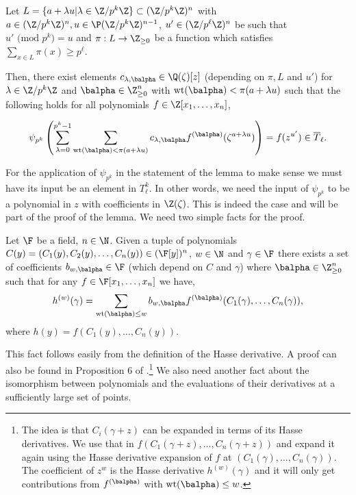 \begin{lem}\label{lem:deRich}
Let $L=\{a+\lambda u| \lambda \in \Z/p^k\Z\}\subset (\Z/p^k\Z)^n$ with $a\in (\Z/p^k\Z)^n,u\in \P (\Z/p^k\Z)^{n-1}$, $u'\in (\Z/p^\ell\Z)^n$ be such that {\em $u'\text{ (mod }p^k\text{)}=u$} and $\pi:L\rightarrow \Z_{\ge 0}$ be a function which satisfies $\sum_{x\in L} \pi(x) \ge p^\ell$. 


Then, there exist elements $c_{\lambda,\balpha} \in \Q(\zeta)[z]$ (depending on $\pi,L$ and $u'$) for $\lambda \in \Z/p^k\Z$ and $\balpha\in  \Z_{\ge 0}^n$ with $\text{wt}(\balpha)< \pi(a+\lambda u)$ such that the following holds for all polynomials $f\in \Z[x_1,\hdots,x_n]$,

{\em$$ \psi_{p^k}\left(\sum\limits_{\lambda =0}^{p^k-1}\sum\limits_{\text{wt}(\balpha) < \pi(a+\lambda u) }c_{\lambda,\balpha} f^{(\balpha)}(\zeta^{a+\lambda u})\right)= f(z^{u'})\in \overline{T}_\ell .$$}
\end{lem}
For the application of $\psi_{p^k}$ in the statement of the lemma to make sense we must have its input be an element in $T_\ell^k$. In other words, we need the input of $\psi_{p^k}$ to be a polynomial in $z$ with coefficients in $\Z(\zeta)$. This is indeed the case and will be part of the proof of the lemma. We need two simple facts for the proof.

\begin{lem}\label{fact:com}
Let $\F$ be a field, $n\in \N$. Given a tuple of polynomials $C(y)=(C_1(y),C_2(y),\hdots,C_n(y))\in (\F[y])^n$, $w\in \N$ and $\gamma\in \F$ there exists a set of coefficients $b_{w,\balpha}\in \F$ (which depend on $C$ and $\gamma$) where $\balpha \in \Z^n_{\ge 0}$ such that for any $f\in \F[x_1,\hdots,x_n]$ we have,
$$h^{(w)}(\gamma)=\sum\limits_{\text{wt}(\balpha)\le w} b_{w,\balpha} f^{(\balpha)}(C_1(\gamma),\hdots,C_n(\gamma)), $$
where $h(y)=f(C_1(y),\hdots,C_n(y))$. 

\end{lem}

This fact follows easily from the definition of the Hasse derivative. A proof can also be found in Proposition 6 of \cite{dvir2013extensions}.\footnote{The idea is that $C_i(\gamma+z)$ can be expanded in terms of its Hasse derivatives. We use that in $f(C_1(\gamma+z),\hdots,C_n(\gamma+z))$ and expand it again using the Hasse derivative expansion of $f$ at $(C_1(\gamma),\hdots,C_n(\gamma))$. The coefficient of $z^w$ is the Hasse derivative $h^{(w)}(\gamma)$ and it will only get contributions from $f^{(\balpha)}$ with $\text{wt}(\balpha)\le w$.} We also need another fact about the isomorphism between polynomials and the evaluations of their derivatives at a sufficiently large set of points.




